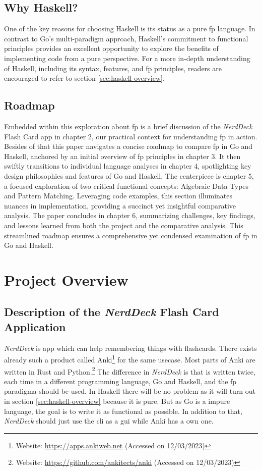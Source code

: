    \section{Why Haskell?}\label{sec:whyhaskell}
    One of the key reasons for choosing Haskell is its status as a pure \ac{fp} language. In contrast to Go's multi-paradigm approach, Haskell's commitment to functional principles provides an excellent opportunity to explore the benefits of implementing code from a pure perspective.
    For a more in-depth understanding of Haskell, including its syntax, features, and \ac{fp} principles, readers are encouraged to refer to section \ref{sec:haskell-overview}.

    \section{Roadmap}\label{sec:roadmap}
    Embedded within this exploration about \ac{fp} is a brief discussion of the \textit{NerdDeck} Flash Card \ac{app} in chapter 2, our practical context for understanding \ac{fp} in action. Besides of that this paper navigates a concise roadmap to compare \ac{fp} in Go and Haskell, anchored by an initial overview of \ac{fp} principles in chapter 3. It then swiftly transitions to individual language analyses in chapter 4, spotlighting key design philosophies and features of Go and Haskell. The centerpiece is chapter 5, a focused exploration of two critical functional concepts: Algebraic Data Types and Pattern Matching. Leveraging code examples, this section illuminates nuances in implementation, providing a succinct yet insightful comparative analysis. The paper concludes in chapter 6, summarizing challenges, key findings, and lessons learned from both the project and the comparative analysis. This streamlined roadmap ensures a comprehensive yet condensed examination of \ac{fp} in Go and Haskell.

\chapter{Project Overview}\label{chap:project-overview}
    \section{Description of the \textit{NerdDeck} Flash Card Application}\label{sec:description}
    \textit{NerdDeck} is app which can help remembering things with flashcards. There exists already such a product called Anki\footnote{Website: \url{https://apps.ankiweb.net} (Accessed on 12/03/2023)} for the same usecase. Most parts of Anki are written in Rust and Python.\footnote{Website: \url{https://github.com/ankitects/anki} (Accessed on 12/03/2023)} The difference in \textit{NerdDeck} is that is written twice, each time in a different programming language, Go and Haskell, and the \ac{fp} paradigma should be used. In Haskell there will be no problem as it will turn out in section \ref{sec:haskell-overview} because it is pure. But as Go is a impure language, the goal is to write it as functional as possible. In addition to that, \textit{NerdDeck} should just use the \ac{cli} as a \ac{gui} while Anki has a own one.

